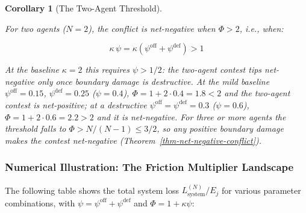 \documentclass[11pt]{article}
\theoremstyle{plain}
\newtheorem{corollary}[theorem]{Corollary}
\theoremstyle{definition}
\theoremstyle{remark}
\let\origsubsubsection\subsubsection
\renewcommand{\subsubsection}{\needspace{4\baselineskip}\origsubsubsection}
\begin{document}
\begin{corollary}[The Two-Agent Threshold]
\label{cor-two-agent-threshold}

For two agents ($N = 2$), the conflict is net-negative when $\Phi > 2$, i.e., when:

$$\kappa \, \psi = \kappa(\psi^{\text{off}} + \psi^{\text{def}}) > 1$$

At the baseline $\kappa = 2$ this requires $\psi > 1/2$: the two-agent contest tips net-negative only once boundary damage is \emph{destructive}. At the mild baseline $\psi^{\text{off}} = 0.15$, $\psi^{\text{def}} = 0.25$ ($\psi = 0.4$), $\Phi = 1 + 2 \cdot 0.4 = 1.8 < 2$ and the two-agent contest is net-positive; at a destructive $\psi^{\text{off}} = \psi^{\text{def}} = 0.3$ ($\psi = 0.6$), $\Phi = 1 + 2 \cdot 0.6 = 2.2 > 2$ and it is net-negative. For three or more agents the threshold falls to $\Phi > N/(N-1) \leq 3/2$, so any positive boundary damage makes the contest net-negative (Theorem~\ref{thm-net-negative-conflict}).
\end{corollary}

\subsubsection{Numerical Illustration: The Friction Multiplier
Landscape}\label{numerical-illustration-the-friction-multiplier-landscape}

The following table shows the total system loss
\(L_{\text{system}}^{(N)} / E_j\) for various parameter combinations,
with \(\psi = \psi^{\text{off}} + \psi^{\text{def}}\) and
\(\Phi = 1 + \kappa\psi\):
\end{document}
